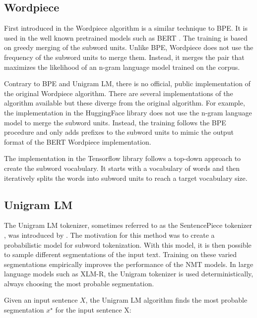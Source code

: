 \subsection{Wordpiece}

First introduced in \cite{SchusterandNakajima2012)} the Wordpiece algorithm is a similar technique to BPE. It is used in the well known pretrained models such as BERT \citep{devlin_bert_2019}. The training is based on greedy merging of the subword units. Unlike BPE, Wordpiece does not use the frequency of the subword units to merge them. Instead, it merges the pair that maximizes the likelihood of an n-gram language model trained on the corpus.

Contrary to BPE and Unigram LM, there is no official, public implementation of the original Wordpiece algorithm. There are several implementations of the algorithm available but these diverge from the original algorithm. For example, the implementation in the HuggingFace library \citep{wolf_transformers_2020} does not use the n-gram language model to merge the subword units. Instead, the training follows the BPE procedure and only adds prefixes to the subword units to mimic the output format of the BERT Wordpiece implementation. 

The implementation in the Tensorflow library follows a top-down approach to create the subword vocabulary. It starts with a vocabulary of words and then iteratively splits the words into subword units to reach a target vocabulary size.


\subsection{Unigram LM}

The Unigram LM tokenizer, sometimes referred to as the SentencePiece tokenizer \citep{kudo_sentencepiece_2018}, was introduced by \citet{kudo_subword_2018}. The motivation for this method was to create a probabilistic model for subword tokenization. With this model, it is then possible to sample different segmentations of the input text. Training on these varied segmentations empirically improves the performance of the NMT models. In large language models such as XLM-R, the Unigram tokenizer is used deterministically, always choosing the most probable segmentation.

Given an input sentence $X$, the Unigram LM algorithm finds the most probable segmentation $x^\star$ for the input sentence X:

